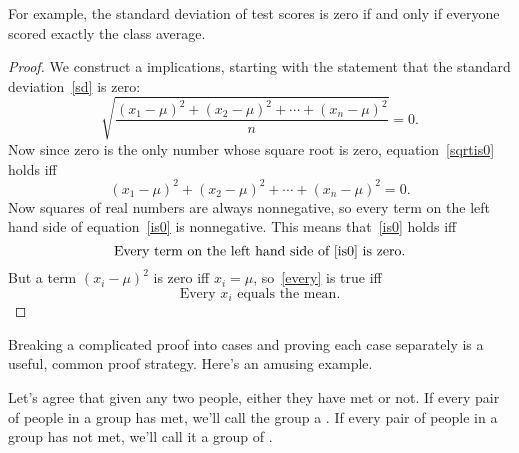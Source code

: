 For example, the standard deviation of test scores is zero if and only
if everyone scored exactly the class average.

\begin{proof}
We construct a  implications, starting with the
statement that the standard deviation~\eqref{sd} is zero:
%
\begin{equation}\label{sqrtis0}
\sqrt{\frac{(x_1 - \mu)^2 + (x_2 - \mu)^2 + \cdots + (x_n - \mu)^2}{n}} = 0.
\end{equation}
%
Now since zero is the only number whose square root is zero,
equation~\eqref{sqrtis0} holds iff
\begin{equation}\label{is0}
(x_1 - \mu)^2 + (x_2 - \mu)^2 + \cdots + (x_n - \mu)^2 = 0.
\end{equation}
Now squares of real numbers are always nonnegative, so every term on the
left hand side of equation~\eqref{is0} is nonnegative.  This means
that~\eqref{is0} holds iff
\begin{equation}\label{every}
\text{Every term on the left hand side of~\eqref{is0} is zero.}
\end{equation}
But a term $(x_i - \mu)^2$ is zero iff $x_i=\mu$, so~\eqref{every} is true
iff
\[
\text{Every $x_i$ equals the mean.}
\]

\end{proof}

\iffalse

\begin{notesproblem}
Reformulate the proof of the Distributive Law for Sets as a chain of
if-and-only-if implications.
\end{notesproblem}
\fi




Breaking a complicated proof into cases and proving each case separately
is a useful, common proof strategy.  Here's an amusing example.

Let's agree that given any two people, either they have met or not.  If
every pair of people in a group has met, we'll call the group a
.  If every pair of people in a group has not met, we'll call
it a group of .

